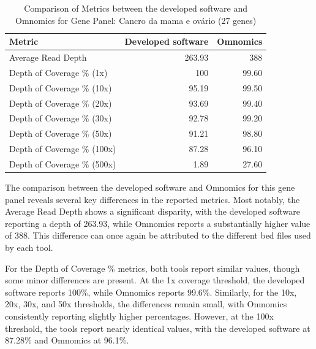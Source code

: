 \begin{table}[H]
    \centering
    \caption{Comparison of Metrics between the developed software and Omnomics for Gene Panel: Cancro da mama e ovário (27 genes)}
    \label{tab:panel_omnomicsVSunilabs}
    \begin{tabular}{@{}lrr@{}}
    \toprule
    \textbf{Metric}             & \textbf{Developed software} & \textbf{Omnomics} \\ \midrule
    Average Read Depth          & 263.93                      & 388               \\
    Depth of Coverage \% (1x)   & 100                         & 99.60             \\
    Depth of Coverage \% (10x)  & 95.19                       & 99.50             \\
    Depth of Coverage \% (20x)  & 93.69                       & 99.40             \\
    Depth of Coverage \% (30x)  & 92.78                       & 99.20             \\
    Depth of Coverage \% (50x)  & 91.21                       & 98.80             \\
    Depth of Coverage \% (100x) & 87.28                       & 96.10             \\
    Depth of Coverage \% (500x) & 1.89                        & 27.60             \\ \bottomrule
    \end{tabular}
    \end{table}
    
    The comparison between the developed software and Omnomics for this gene panel reveals several key differences in the reported metrics. Most notably, the Average Read Depth shows a significant disparity, with the developed software reporting a depth of 263.93, while Omnomics reports a substantially higher value of 388. This difference can once again be attributed to the different \ac{bed} files used by each tool.
    
    For the Depth of Coverage \% metrics, both tools report similar values, though some minor differences are present. At the 1x coverage threshold, the developed software reports 100\%, while Omnomics reports 99.6\%. Similarly, for the 10x, 20x, 30x, and 50x thresholds, the differences remain small, with Omnomics consistently reporting slightly higher percentages. However, at the 100x threshold, the tools report nearly identical values, with the developed software at 87.28\% and Omnomics at 96.1\%.
    
